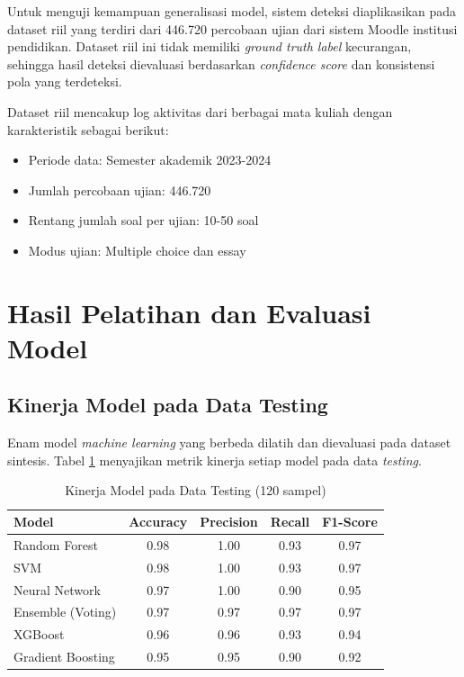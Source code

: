 Untuk menguji kemampuan generalisasi model, sistem deteksi diaplikasikan pada dataset riil yang terdiri dari 446.720 percobaan ujian dari sistem Moodle institusi pendidikan. Dataset riil ini tidak memiliki \textit{ground truth label} kecurangan, sehingga hasil deteksi dievaluasi berdasarkan \textit{confidence score} dan konsistensi pola yang terdeteksi.

Dataset riil mencakup log aktivitas dari berbagai mata kuliah dengan karakteristik sebagai berikut:
\begin{itemize}
    \item Periode data: Semester akademik 2023-2024
    \item Jumlah percobaan ujian: 446.720
    \item Rentang jumlah soal per ujian: 10-50 soal
    \item Modus ujian: Multiple choice dan essay
\end{itemize}

\section{Hasil Pelatihan dan Evaluasi Model}
\label{sec:hasilPelatihanEvaluasi}

\subsection{Kinerja Model pada Data Testing}
\label{subsec:kinerjaModelTesting}

Enam model \textit{machine learning} yang berbeda dilatih dan dievaluasi pada dataset sintesis. Tabel \ref{tabel:kinerjaModel} menyajikan metrik kinerja setiap model pada data \textit{testing}.

\begin{table}[htbp]
\centering
\caption{Kinerja Model pada Data Testing (120 sampel)}
\label{tabel:kinerjaModel}
\begin{tabular}{|l|c|c|c|c|}
\hline
\textbf{Model} & \textbf{Accuracy} & \textbf{Precision} & \textbf{Recall} & \textbf{F1-Score} \\
\hline
Random Forest & 0.98 & 1.00 & 0.93 & 0.97 \\
\hline
SVM & 0.98 & 1.00 & 0.93 & 0.97 \\
\hline
Neural Network & 0.97 & 1.00 & 0.90 & 0.95 \\
\hline
Ensemble (Voting) & 0.97 & 0.97 & 0.97 & 0.97 \\
\hline
XGBoost & 0.96 & 0.96 & 0.93 & 0.94 \\
\hline
Gradient Boosting & 0.95 & 0.95 & 0.90 & 0.92 \\
\hline
\end{tabular}
\end{table}

